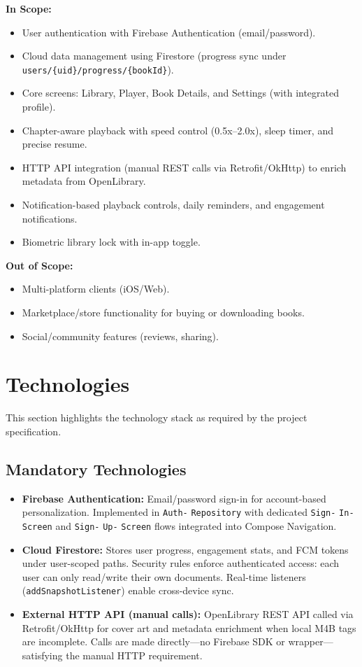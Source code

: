 \documentclass[11pt,a4paper]{article}
\begin{document}
\textbf{In Scope:}
\begin{itemize}[noitemsep]
    \item User authentication with Firebase Authentication (email/password).
    \item Cloud data management using Firestore (progress sync under \texttt{users/\{uid\}/progress/\{bookId\}}).
    \item Core screens: Library, Player, Book Details, and Settings (with integrated profile).
    \item Chapter-aware playback with speed control (0.5x--2.0x), sleep timer, and precise resume.
    \item HTTP API integration (manual REST calls via Retrofit/OkHttp) to enrich metadata from OpenLibrary.
    \item Notification-based playback controls, daily reminders, and engagement notifications.
    \item Biometric library lock with in-app toggle.
\end{itemize}

\textbf{Out of Scope:}
\begin{itemize}[noitemsep]
    \item Multi-platform clients (iOS/Web).
    \item Marketplace/store functionality for buying or downloading books.
    \item Social/community features (reviews, sharing).
\end{itemize}

\section{Technologies}

This section highlights the technology stack as required by the project specification.

\subsection{Mandatory Technologies}

\begin{itemize}[noitemsep]
    \item \textbf{Firebase Authentication:} Email/password sign-in for account-based personalization. Implemented in \texttt{Auth-} \texttt{Repository} with dedicated \texttt{Sign-} \texttt{In-} \texttt{Screen} and \texttt{Sign-} \texttt{Up-} \texttt{Screen} flows integrated into Compose Navigation.
    \item \textbf{Cloud Firestore:} Stores user progress, engagement stats, and FCM tokens under user-scoped paths. Security rules enforce authenticated access: each user can only read/write their own documents. Real-time listeners (\texttt{addSnapshotListener}) enable cross-device sync.
    \item \textbf{External HTTP API (manual calls):} OpenLibrary REST API called via Retrofit/OkHttp for cover art and metadata enrichment when local M4B tags are incomplete. Calls are made directly---no Firebase SDK or wrapper---satisfying the manual HTTP requirement.
\end{itemize}
\end{document}
